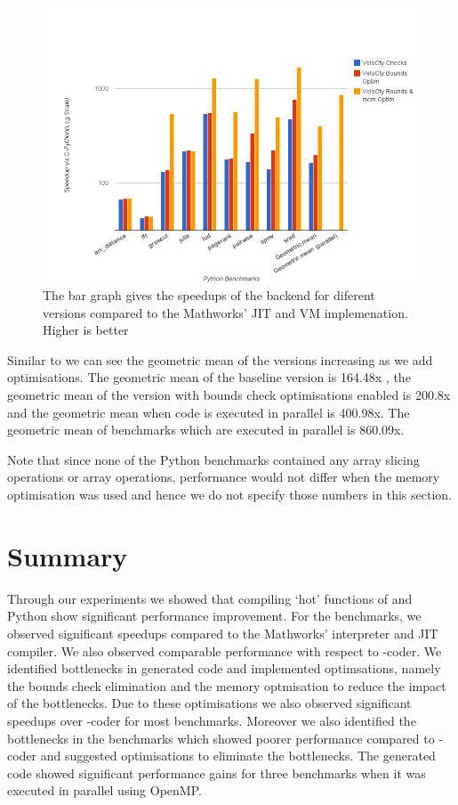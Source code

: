 \begin{figure}[htbp]
\centering
\includegraphics[scale=0.5]{Figures/final_py.png}
\caption[Summary of Python Results]{The bar graph gives the speedups of the \velocty backend for diferent \velocty versions compared to the Mathworks' JIT and VM implemenation. Higher is better }
\label{fig:results_final}
\end{figure}

Similar to \matlab we can see the geometric mean of the \velocty versions increasing as we add optimisations. The geometric mean of the baseline \velocty version is 164.48x , the geometric mean of the version with bounds check optimisations enabled is 200.8x and the geometric mean when \velocty code is executed in parallel is 400.98x. The geometric mean of benchmarks which are executed in parallel is 860.09x.

Note that since none of the Python benchmarks contained any array slicing operations or array operations, performance would not differ when the memory optimisation was used and hence we do not specify those numbers in this section. 
\section{Summary}
Through our experiments we showed that compiling `hot' functions of \matlab and Python show significant performance improvement. 
For the \matlab benchmarks, we observed significant  speedups compared to the Mathworks' \matlab interpreter and JIT compiler. We also observed comparable performance with respect to \matlab-coder. We identified bottlenecks in generated code and implemented optimsations, namely the bounds check elimination and the memory optmisation to reduce the impact of the bottlenecks. Due to these optimisations we also observed significant speedups over \matlab-coder for most benchmarks. Moreover we also identified the bottlenecks in the benchmarks which showed poorer performance compared to \matlab-coder and suggested optimisations to eliminate the bottlenecks. The generated code showed significant performance gains for three benchmarks when it was executed in parallel using OpenMP.

